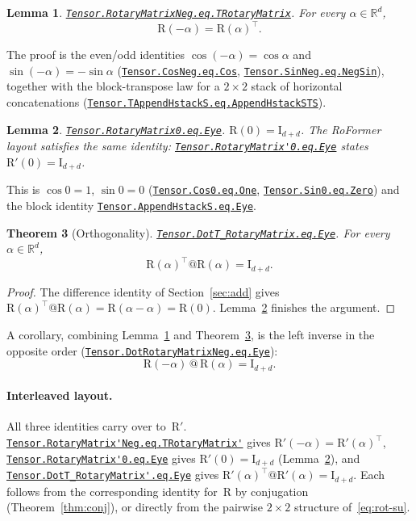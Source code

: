 \documentclass[11pt,a4paper]{article}
\newcommand{\lmod}[1]{\href{http://www.lemma.cn/lean/?module=#1}{\nolinkurl{#1}}}
\newtheorem{theorem}{Theorem}[section]
\newtheorem{lemma}[theorem]{Lemma}
\newcommand{\R}{\mathbb{R}}
\newcommand{\rot}{\mathrm{R}}
\newcommand{\eye}{\mathrm{I}}
\begin{document}
\begin{lemma}
\label{lem:neg-T}
\lmod{Tensor.RotaryMatrixNeg.eq.TRotaryMatrix}.
For every \(\alpha\in\R^d\),
\begin{equation}
  \rot(-\alpha) = \rot(\alpha)^\top.
\end{equation}
\end{lemma}

The proof is the even/odd identities \(\cos(-\alpha)=\cos\alpha\) and \(\sin(-\alpha)=-\sin\alpha\)
(\lmod{Tensor.CosNeg.eq.Cos}, \lmod{Tensor.SinNeg.eq.NegSin}),
together with the block-transpose law for a \(2\times 2\) stack of horizontal concatenations
(\lmod{Tensor.TAppendHstackS.eq.AppendHstackSTS}).

\begin{lemma}
\label{lem:R0}
\lmod{Tensor.RotaryMatrix0.eq.Eye}.
\(\rot(0)=\eye_{d+d}\).
The RoFormer layout satisfies the same identity:
\lmod{Tensor.RotaryMatrix'0.eq.Eye} states \(\rot'(0)=\eye_{d+d}\).
\end{lemma}

This is \(\cos 0=1\), \(\sin 0=0\)
(\lmod{Tensor.Cos0.eq.One}, \lmod{Tensor.Sin0.eq.Zero})
and the block identity
\lmod{Tensor.AppendHstackS.eq.Eye}.

\begin{theorem}[Orthogonality]
\label{thm:orth}
\lmod{Tensor.DotT_RotaryMatrix.eq.Eye}.
For every \(\alpha\in\R^d\),
\begin{equation}
  \rot(\alpha)^\top @ \rot(\alpha) = \eye_{d+d}.
\end{equation}
\end{theorem}

\begin{proof}
The difference identity of Section~\ref{sec:add} gives
\(\rot(\alpha)^\top @ \rot(\alpha)=\rot(\alpha-\alpha)=\rot(0)\).
Lemma~\ref{lem:R0} finishes the argument.
\end{proof}

A corollary, combining Lemma~\ref{lem:neg-T} and Theorem~\ref{thm:orth}, is the left inverse in the opposite order
(\lmod{Tensor.DotRotaryMatrixNeg.eq.Eye}):
\begin{equation}
  \rot(-\alpha)\,@\,\rot(\alpha) = \eye_{d+d}.
\end{equation}

\paragraph{Interleaved layout.}
All three identities carry over to~\(\rot'\).
\lmod{Tensor.RotaryMatrix'Neg.eq.TRotaryMatrix'} gives \(\rot'(-\alpha)=\rot'(\alpha)^\top\),
\lmod{Tensor.RotaryMatrix'0.eq.Eye} gives \(\rot'(0)=\eye_{d+d}\) (Lemma~\ref{lem:R0}),
and \lmod{Tensor.DotT_RotaryMatrix'.eq.Eye} gives
\(\rot'(\alpha)^\top @ \rot'(\alpha) = \eye_{d+d}\).
Each follows from the corresponding identity for~\(\rot\) by conjugation (Theorem~\ref{thm:conj}), or directly from the pairwise \(2\times 2\) structure of~\eqref{eq:rot-su}.
\end{document}
